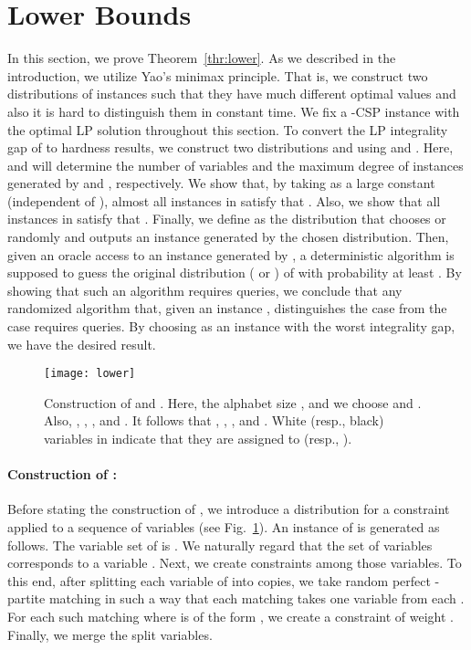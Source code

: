 \documentclass[letterpaper, 11pt]{article}
\begin{document}
\section{Lower Bounds}\label{sec:lower}
In this section, we prove Theorem~\ref{thr:lower}.
As we described in the introduction, we utilize Yao's minimax principle.
That is, we construct two distributions of instances such that they have much different optimal values and also it is hard to distinguish them in constant time.
We fix a -CSP instance  with the optimal LP solution  throughout this section.
To convert the LP integrality gap  of  to hardness results,
we construct two distributions  and  using  and .
Here,  and  will determine the number of variables and the maximum degree of instances generated by  and , respectively.
We show that, by taking  as a large constant (independent of ),
almost all instances  in  satisfy that .
Also, we show that all instances  in  satisfy that .
Finally, we define  as the distribution that chooses  or  randomly and outputs an instance generated by the chosen distribution.
Then, given an oracle access  to an instance  generated by ,
a deterministic algorithm is supposed to guess the original distribution ( or ) of  with probability at least .
By showing that such an algorithm requires  queries,
we conclude that any randomized algorithm that,
given an instance ,
distinguishes the case  from the case 
requires  queries.
By choosing as  an instance with the worst integrality gap,
we have the desired result.
\begin{figure}[t]
  \begin{center}
    \texttt{[image: lower]}
    \caption{Construction of  and .
      Here, the alphabet size , 
      and we choose  and .
      Also, , , , and .
      It follows that , , , and .
      White (resp., black) variables in  indicate that they are assigned to  (resp., ).
    }
    \label{fig:lower}
  \end{center}
\end{figure}
\paragraph{Construction of :}
Before stating the construction of ,
we introduce a distribution  for a constraint  applied to a sequence of variables  (see Fig.~\ref{fig:lower}). 
An instance  of  is generated as follows.
The variable set of  is .
We naturally regard that the set of variables  corresponds to a variable .
Next, we create  constraints among those variables.
To this end, after splitting each variable of  into  copies,
we take random perfect -partite matching in such a way that each matching takes one variable from each .
For each such matching  where  is of the form ,
we create a constraint  of weight .
Finally, we merge the split variables.
\end{document}
